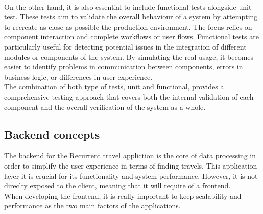 \documentclass[../memory.tex]{subfiles}
\begin{document}
\\
On the other hand, it is also essential to include functional tests alongside
unit test. These tests aim to validate the overall behaviour of a system by
attempting to recreate as close as possible the production environment. The
focus relies on component interaction and complete workflows or user flows.
Functional tests are particularly useful for detecting potential issues in the
integration of different modules or components of the system. By simulating the
real usage, it becomes easier to identify problems in communication between
components, errors in business logic, or differences in user experience.
\\
The combination of both type of tests, unit and functional, provides a
comprehensive testing approach that covers both the internal validation of each
component and the overall verification of the system as a whole.
\subsection{Backend concepts}
The backend for the Recurrent travel appliction is the core of data processing
in order to simplify the user experience in terms of finding travels. This
application layer it is crucial for its functionality and system performance.
However, it is not direclty exposed to the client, meaning that it will require
of a frontend.
\\
When developing the frontend, it is really important to keep scalability and
performance as the two main factors of the applications.
\end{document}
